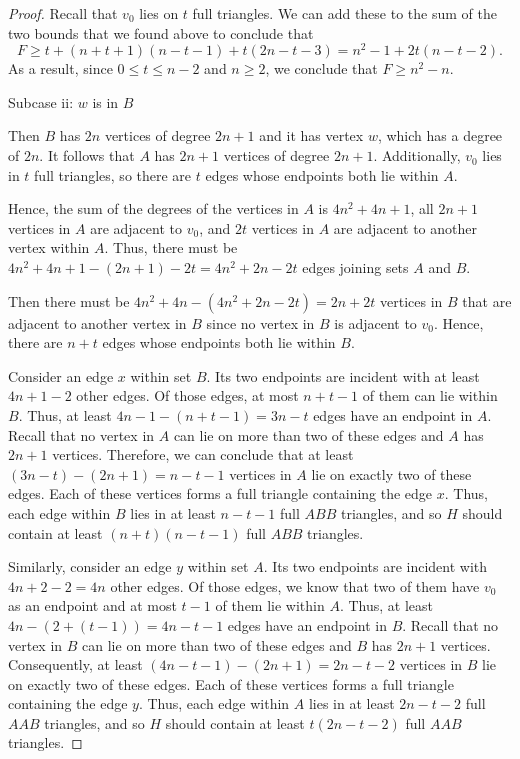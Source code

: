 \documentclass[10pt]{amsart}
\begin{document}
\begin{proof}
    Recall that $v_0$ lies on $t$ full triangles. We can add these to the sum of the two bounds that
    we found above to conclude that
    $$ F \ge t + (n + t + 1)(n - t - 1) + t(2n - t - 3) = n^2 - 1 + 2t(n - t - 2). $$
    As a result, since $0 \le t \le n - 2$ and $n \ge 2$, we conclude that $F \ge n^2 - n$.

    \noindent Subcase ii: $w$ is in $B$

    Then $B$ has $2n$ vertices of degree $2n + 1$ and it has vertex $w$, which has a degree of $2n$. 
    It follows that $A$ has $2n + 1$ vertices of degree $2n + 1$. Additionally, $v_0$ lies in $t$ 
    full triangles, so there are $t$ edges whose endpoints both lie within $A$.

    Hence, the sum of the degrees of the vertices in $A$ is $4n^2 + 4n + 1$, all $2n + 1$ vertices 
    in $A$ are adjacent to $v_0$, and $2t$ vertices in $A$ are adjacent to another vertex 
    within $A$. Thus, there must be $4n^2 + 4n + 1 - (2n + 1) - 2t = 4n^2 + 2n - 2t$ edges 
    joining sets $A$ and $B$.

    Then there must be $4n^2 + 4n - (4n^2 + 2n - 2t) = 2n + 2t$ vertices in $B$ 
    that are adjacent to another vertex in $B$ since no vertex in $B$ is adjacent to $v_0$. 
    Hence, there are $n + t$ edges whose endpoints both lie within $B$.

    Consider an edge $x$ within set $B$. Its two endpoints are incident with at least
    $4n + 1 - 2$ other edges. Of those edges, at most $n + t - 1$ of them can lie within $B$. 
    Thus, at least $4n - 1 - (n + t - 1) = 3n - t$ edges have an endpoint in $A$. Recall that 
    no vertex in $A$ can lie on more than two of these edges and $A$ has $2n + 1$ vertices. 
    Therefore, we can conclude that at least $(3n - t) - (2n + 1) = n - t - 1$ vertices in $A$ 
    lie on exactly two of these edges. Each of these vertices forms a full triangle containing 
    the edge $x$.
    Thus, each edge within $B$ lies in at least $n - t - 1$ full $ABB$ triangles, and so $H$ should 
    contain at least $(n + t)(n - t - 1)$ full $ABB$ triangles.

    Similarly, consider an edge $y$ within set $A$. Its two endpoints are incident with 
    $4n + 2 - 2 = 4n$ other edges. Of those edges, we know that two of them have $v_0$ as 
    an endpoint and at most $t - 1$ of them lie within $A$. Thus, at least 
    $4n - (2 + (t - 1)) = 4n - t - 1$ edges have an endpoint in $B$. Recall that no vertex in $B$ 
    can lie on more than two of these edges and $B$ has $2n + 1$ vertices. Consequently, at least 
    $(4n - t - 1) - (2n + 1) = 2n - t - 2$ vertices in $B$ lie on exactly two of these edges. Each of 
    these vertices forms a full triangle containing the edge $y$.
    Thus, each edge within $A$ lies in at least $2n - t - 2$ full $AAB$ triangles, and so $H$ should 
    contain at least $t(2n - t - 2)$ full $AAB$ triangles. 
    

\end{proof}
\end{document}
